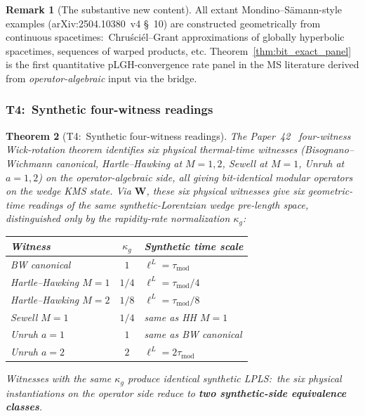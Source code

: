 \documentclass[11pt,a4paper]{article}
\theoremstyle{plain}
\newtheorem{theorem}{Theorem}[section]
\theoremstyle{definition}
\newtheorem{remark}[theorem]{Remark}
\newcommand{\Wfun}{\mathbf{W}}
\newcommand{\tmod}{\tau_{\mathrm{mod}}}
\newcommand{\kappag}{\kappa_{g}}
\begin{document}
\begin{remark}[The substantive new content]\label{rem:t3_substantive}
All extant Mondino--S\"amann-style examples (arXiv:2504.10380~v4 \S~10)
are constructed geometrically from continuous spacetimes:\
Chruści\'el--Grant approximations of globally hyperbolic spacetimes,
sequences of warped products, etc. Theorem~\ref{thm:bit_exact_panel}
is the first quantitative pLGH-convergence rate panel in the MS
literature derived from \emph{operator-algebraic} input via the
bridge.
\end{remark}

\subsubsection{T4:\ Synthetic four-witness
readings}\label{sec:t4_synthetic_four_witness}

\begin{theorem}[T4:\ Synthetic four-witness
readings]\label{thm:synthetic_four_witness}
The Paper~42~\cite{paper42} four-witness Wick-rotation theorem
identifies six physical thermal-time witnesses (Bisognano--Wichmann
canonical, Hartle--Hawking at $M = 1, 2$, Sewell at $M = 1$, Unruh at
$a = 1, 2$) on the operator-algebraic side, all giving bit-identical
modular operators on the wedge KMS state. Via $\Wfun$, these six
physical witnesses give six geometric-time readings of the same
synthetic-Lorentzian wedge pre-length space, distinguished only by
the rapidity-rate normalization $\kappag$:

\begin{center}
\begin{tabular}{lcl}
\toprule
Witness & $\kappag$ & Synthetic time scale \\
\midrule
BW canonical & $1$ & $\ell^{L} = \tmod$ \\
Hartle--Hawking $M = 1$ & $1/4$ & $\ell^{L} = \tmod/4$ \\
Hartle--Hawking $M = 2$ & $1/8$ & $\ell^{L} = \tmod/8$ \\
Sewell $M = 1$ & $1/4$ & same as HH $M = 1$ \\
Unruh $a = 1$ & $1$ & same as BW canonical \\
Unruh $a = 2$ & $2$ & $\ell^{L} = 2\tmod$ \\
\bottomrule
\end{tabular}
\end{center}

Witnesses with the same $\kappag$ produce identical synthetic LPLS:\
the six physical instantiations on the operator side reduce to
\textbf{two synthetic-side equivalence classes}.
\end{theorem}
\end{document}
